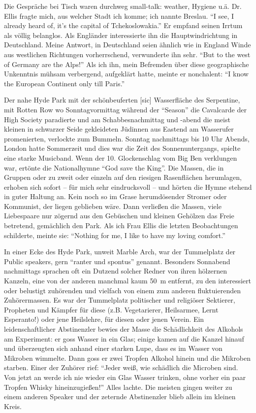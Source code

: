 Die Gespräche bei Tisch waren durchweg small-talk: weather, Hygiene u.ä. Dr. Ellis fragte mich, aus welcher Stadt ich komme; ich nannte Breslau. \enquote{I see, I already heard of, it's the capital of Tchekoslowakia.} Er empfand seinen Irrtum als völlig belanglos. Als Engländer interessierte ihn die Hauptwindrichtung in Deutschland. Meine Antwort, in Deutschland seien ähnlich wie in England Winde aus westlichen Richtungen vorherrschend, verwunderte ihn sehr. \enquote{But to the west of Germany are the Alps!} Als ich ihn, mein Befremden über diese geographische Unkenntnis mühsam verbergend, aufgeklärt hatte, meinte er nonchalent: \enquote{I know the European Continent only till Paris.}

Der nahe Hyde Park mit der schönbeuferten [sic] Wasserfläche des Serpentine, mit Rotten Row wo Sonntagvormittag während der \enquote{Season} die Cavalcarde der High Society paradierte und am Schabbesnachmittag und -abend die meist kleinen in schwarzer Seide gekleideten Jüdinnen aus Eastend am Wasserufer promenierten, verlockte zum Bummeln. Sonntag nachmittags bis 10 Uhr Abends, London hatte Sommerzeit und dies war die Zeit des Sonnenuntergangs, spielte eine starke Musicband. Wenn der 10. Glockenschlag vom Big Ben verklungen war, ertönte die Nationalhymne \enquote{God save the King}. Die Massen, die in Gruppen oder zu zweit oder einzeln auf den riesigen Rasenflächen herumlagen, erhoben sich sofort -- für mich sehr eindrucksvoll -- und hörten die Hymne stehend in guter Haltung an. Kein noch so im Grase herumdösender Stromer oder Kommunist, der liegen geblieben wäre. Dann verließen die Massen, viele Liebespaare nur zögernd aus den Gebüschen und kleinen Gehölzen das Freie betretend, gemächlich den Park. Als ich Frau Ellis die letzten Beobachtungen schilderte, meinte sie: \enquote{Nothing for me, I like to have my loving comfort.}

In einer Ecke des Hyde Park, unweit Marble Arch, war der Tummelplatz der Public speakers, gern \enquote{ranter und spontus} genannt. Besonders Sonnabend nachmittags sprachen oft ein Dutzend solcher Redner von ihren hölzernen Kanzeln, eine von der anderen manchmal kaum 50~m entfernt, zu den interessiert oder belustigt zuhörenden und vielfach von einem zum anderen fluktuierenden Zuhörermassen. Es war der Tummelplatz politischer und religiöser Sektierer, Propheten und Kämpfer für diese (z.B. Vegetarierer, Heilsarmee, Lernt Esperanto!) oder jene Heilslehre, für diesen oder jenen Verein. Ein leidenschaftlicher Abstinenzler bewies der Masse die Schädlichkeit des Alkohols am Experiment: er goss Wasser in ein Glas; einige kamen auf die Kanzel hinauf und überzeugten sich anhand einer starken Lupe, dass es im Wasser von Mikroben wimmelte. Dann goss er zwei Tropfen Alkohol hinein und die Mikroben starben. Einer der Zuhörer rief: \enquote{Jeder weiß, wie schädlich die Microben sind. Von jetzt an werde ich nie wieder ein Glas Wasser trinken, ohne vorher ein paar Tropfen Whisky hineinzugießen!} Alles lachte. Die meisten gingen weiter zu einem anderen Speaker und der zeternde Abstinenzler blieb allein im kleinen Kreis.

